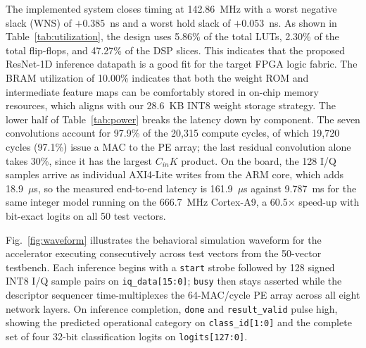 \documentclass[conference]{IEEEtran}
\begin{document}
The implemented system closes timing at 142.86~MHz with a worst negative slack (WNS) of $+0.385$~ns and a worst hold slack of $+0.053$~ns. As shown in Table~\ref{tab:utilization}, the design uses 5.86\% of the total LUTs, 2.30\% of the total flip-flops, and 47.27\% of the DSP slices. This indicates that the proposed ResNet-1D inference datapath is a good fit for the target FPGA logic fabric. The BRAM utilization of 10.00\% indicates that both the weight ROM and intermediate feature maps can be comfortably stored in on-chip memory resources, which aligns with our 28.6~KB INT8 weight storage strategy. The lower half of Table~\ref{tab:power} breaks the latency down by component. The seven convolutions account for 97.9\% of the 20,315 compute cycles, of which 19,720 cycles (97.1\%) issue a MAC to the PE array; the last residual convolution alone takes 30\%, since it has the largest $C_{in}K$ product. On the board, the 128 I/Q samples arrive as individual AXI4-Lite writes from the ARM core, which adds 18.9~$\mu$s, so the measured end-to-end latency is 161.9~$\mu$s against 9.787~ms for the same integer model running on the 666.7~MHz Cortex-A9, a 60.5$\times$ speed-up with bit-exact logits on all 50 test vectors. %

Fig.~\ref{fig:waveform} illustrates the behavioral simulation waveform for the accelerator executing consecutively across test vectors from the 50-vector testbench. Each inference begins with a \texttt{start} strobe followed by 128 signed INT8 I/Q sample pairs on \texttt{iq\_data[15:0]}; \texttt{busy} then stays asserted while the descriptor sequencer time-multiplexes the 64-MAC/cycle PE array across all eight network layers. On inference completion, \texttt{done} and \texttt{result\_valid} pulse high, showing the predicted operational category on \texttt{class\_id[1:0]} and the complete set of four 32-bit classification logits on \texttt{logits[127:0]}.%

\end{document}
